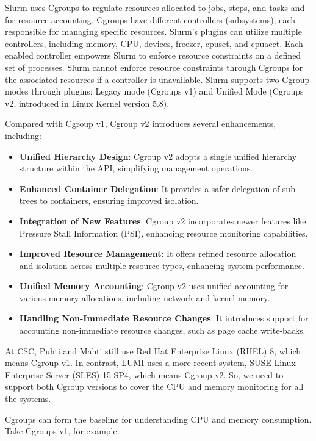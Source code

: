 Slurm uses Cgroups to regulate resources allocated to jobs, steps, and tasks and for resource accounting. Cgroups have different controllers (subsystems), each responsible for managing specific resources. Slurm's plugins can utilize multiple controllers, including memory, CPU, devices, freezer, cpuset, and cpuacct. Each enabled controller empowers Slurm to enforce resource constraints on a defined set of processes. Slurm cannot enforce resource constraints through Cgroups for the associated resources if a controller is unavailable. Slurm supports two Cgroup modes through plugins: Legacy mode (Cgroups v1) and Unified Mode (Cgroups v2, introduced in Linux Kernel version 5.8).

Compared with Cgroup v1, Cgroup v2 introduces several enhancements, including:
\begin{itemize}
    \item \textbf{Unified Hierarchy Design}: Cgroup v2 adopts a single unified hierarchy structure within the API, simplifying management operations.
    \item \textbf{Enhanced Container Delegation}: It provides a safer delegation of sub-trees to containers, ensuring improved isolation.
    \item \textbf{Integration of New Features}: Cgroup v2 incorporates newer features like Pressure Stall Information (PSI), enhancing resource monitoring capabilities.
    \item \textbf{Improved Resource Management}: It offers refined resource allocation and isolation across multiple resource types, enhancing system performance.
    \item \textbf{Unified Memory Accounting}: Cgroup v2 uses unified accounting for various memory allocations, including network and kernel memory.
    \item \textbf{Handling Non-Immediate Resource Changes}: It introduces support for accounting non-immediate resource changes, such as page cache write-backs.
\end{itemize}

At CSC, Puhti and Mahti still use Red Hat Enterprise Linux (RHEL) 8, which means Cgroup v1. In contrast, LUMI uses a more recent system, SUSE Linux Enterprise Server (SLES) 15 SP4, which means Cgroup v2. So, we need to support both Cgroup versions to cover the CPU and memory monitoring for all the systems.

Cgroups can form the baseline for understanding CPU and memory consumption. Take Cgroups v1, for example:

